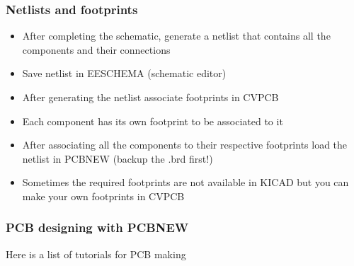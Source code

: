 \documentclass[16pt]{article}
\begin{document}
\subsubsection{Netlists and
footprints}

\begin{itemize}

\item
  After completing the schematic, generate a netlist that contains all
  the components and their connections
\item
  Save netlist in EESCHEMA (schematic editor)
\item
  After generating the netlist associate footprints in CVPCB
\item
  Each component has its own footprint to be associated to it
\item
  After associating all the components to their respective footprints
  load the netlist in PCBNEW (backup the .brd first!)
\end{itemize}


\begin{itemize}

\item
  Sometimes the required footprints are not available in KICAD but you
  can make your own footprints in CVPCB
\end{itemize}

\subsubsection{PCB designing with
PCBNEW}

Here is a list of tutorials for PCB making


\vspace{17cm}
\end{document}

